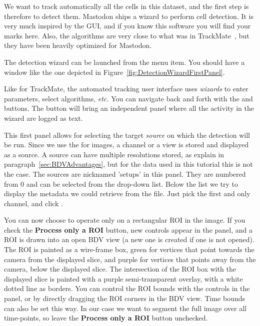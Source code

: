 We want to track automatically all the cells in this dataset, and the first step is therefore to detect them.
Mastodon ships a wizard to perform cell detection. 
It is very much inspired by the  GUI, and if you know this software you will find your marks here.
Also, the algorithms are very close to what was in TrackMate~\cite{TrackMate}, but they have been heavily optimized for Mastodon.

The detection wizard can be launched from the  menu item. 
You should have a window like the one depicted in Figure~\ref{fig:DetectionWizardFirstPanel}.

Like for TrackMate, the automated tracking user interface uses \textit{wizards} to enter parameters, select algorithms, \textit{etc.}
You can navigate back and forth with the  and   buttons. 
The  button will bring an independent panel where all the activity in the wizard are logged as text. 

This first panel allows for selecting the target \textit{source} on which the detection will be run. 
Since we use the \bdv for images, a channel or a view is stored and displayed as a source. 
A source can have multiple resolutions stored, as explain in paragraph~\ref{sec:BDVAdvantages}, but for the data used in this tutorial this is not the case. The sources are nicknamed 'setups' in this panel.
They are numbered from 0 and can be selected from the drop-down list. 
Below the list we try to display the metadata we could retrieve from the \bdv file.
Just pick the first and only channel, and click .

You can now choose to operate only on a rectangular ROI in the image. 
If you check the \textbf{Process only a ROI} button, new controls appear in the panel, and a ROI is drawn into an open BDV view (a new one is created if one is not opened).
The ROI is painted as a wire-frame box, green for vertices that point towards the camera from the displayed slice, and purple for vertices that points away from the camera, below the displayed slice.
The intersection of the ROI box with the displayed slice is painted with a purple semi-transparent overlay, with a white dotted line as borders.
You can control the ROI bounds with the controls in the panel, or by directly dragging the ROI corners in the BDV view.
Time bounds can also be set this way. In our case we want to segment the full image over all time-points, so leave the \textbf{Process only a ROI} button unchecked.

